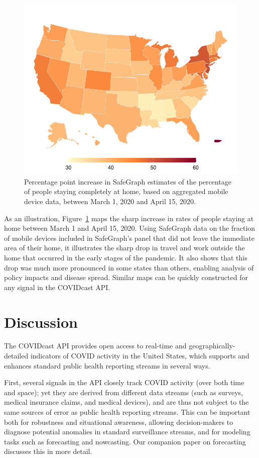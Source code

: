 \documentclass[9pt,twocolumn,twoside,lineno]{pnas-new}
\begin{document}
\begin{figure}
  \centering
  \includegraphics[width=\columnwidth]{fig/mobility-drop.pdf}
  \caption{Percentage point increase in SafeGraph estimates of the percentage of
  people staying completely at home, based on aggregated mobile device data,
  between March 1, 2020 and April 15, 2020.}
  \label{fig:mobility-drop}
\end{figure}

As an illustration, Figure~\ref{fig:mobility-drop} maps the sharp increase in
rates of people staying at home between March 1 and April 15, 2020. Using
SafeGraph data on the fraction of mobile devices included in SafeGraph's panel
that did not leave the immediate area of their home, it illustrates the sharp
drop in travel and work outside the home that occurred in the early stages of
the pandemic. It also shows that this drop was much more pronounced in some
states than others, enabling analysis of policy impacts and disease spread.
Similar maps can be quickly constructed for any signal in the COVIDcast API.

\section{Discussion}

The COVIDcast API provides open access to real-time and geographically-detailed
indicators of COVID activity in the United States, which supports and enhances
standard public health reporting streams in several ways.

First, several signals in the API closely track COVID activity (over both time
and space); yet they are derived from different data streams (such as surveys,
medical insurance claims, and medical devices), and are thus not subject to the
same sources of error as public health reporting streams. This can be important
both for robustness and situational awareness, allowing decision-makers to
diagnose potential anomalies in standard surveillance streams, and for modeling
tasks such as forecasting and nowcasting. Our companion paper on forecasting
discusses this in more detail.
\end{document}
